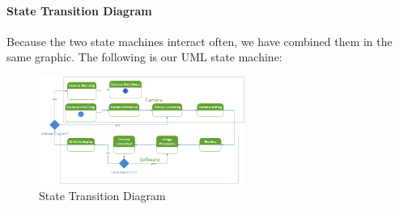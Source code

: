 	\paragraph{State Transition Diagram}
	Because the two state machines interact often, we have combined them in the same graphic. The following is our UML state machine:\\
	\par
	\begin{figure}[H] 
		\centering
		\includegraphics[width=0.6\textwidth,natwidth=610,natheight=642]{images/StateTransition_Diagram.png} 
		\caption{State Transition Diagram} 
		\end{figure}

